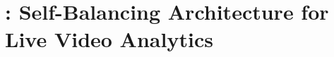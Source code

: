 \setchapterpreamble[u]{\margintoc}
\chapter{\videojam{}: Self-Balancing Architecture for Live Video Analytics}
\label{ch:videojam}











 

